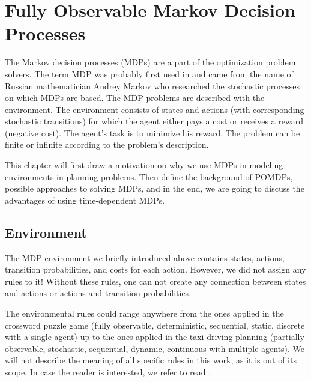 




\chapter{Fully Observable Markov Decision Processes}

The Markov decision processes (MDPs) are a part of the optimization problem solvers. The term MDP was probably first used in \cite{cite:1} and came from the name of Russian mathematician Andrey Markov who researched the stochastic processes on which MDPs are based. The MDP problems are described with the environment. The environment consists of states and actions (with corresponding stochastic transitions) for which the agent either pays a cost or receives a reward (negative cost). The agent's task is to minimize his reward. The problem can be finite or infinite according to the problem's description.

This chapter will first draw a motivation on why we use MDPs in modeling environments in planning problems. Then define the background of POMDPs, possible approaches to solving MDPs, and in the end, we are going to discuss the advantages of using time-dependent MDPs.


\section{Environment}
The MDP environment we briefly introduced above contains states, actions, transition probabilities, and costs for each action. However, we did not assign any rules to it! 
Without these rules, one can not create any connection between states and actions or actions and transition probabilities.

The environmental rules could range anywhere from the ones applied in the crossword puzzle game (fully observable, deterministic, sequential, static, discrete with a single agent) up to the ones applied in the taxi driving planning (partially observable, stochastic, sequential, dynamic, continuous with multiple agents). We will not describe the meaning of all specific rules in this work, as it is out of its scope. In case the reader is interested, we refer to read  \cite{russel2010}.


